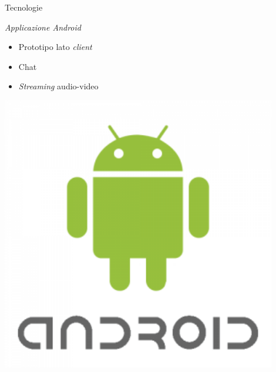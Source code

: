 \begin{frame}{Tecnologie}
\begin{center}
\begin{minipage}{\textwidth}
\begin{minipage}{0.60\textwidth}
						\begin{block}{\emph{Applicazione Android}}
							\begin{itemize}
								\item Prototipo lato \emph{client}
								\item Chat
								\item \emph{Streaming} audio-video
							\end{itemize}
						\end{block}
					\end{minipage}
					\begin{minipage}{0.29\textwidth}
							\begin{flushright}
								\includegraphics[width=0.9\textwidth]{capitolo_2/immagini/android.png}
							\end{flushright}
					\end{minipage}
				\end{minipage}
			\end{center}
		\end{frame}
